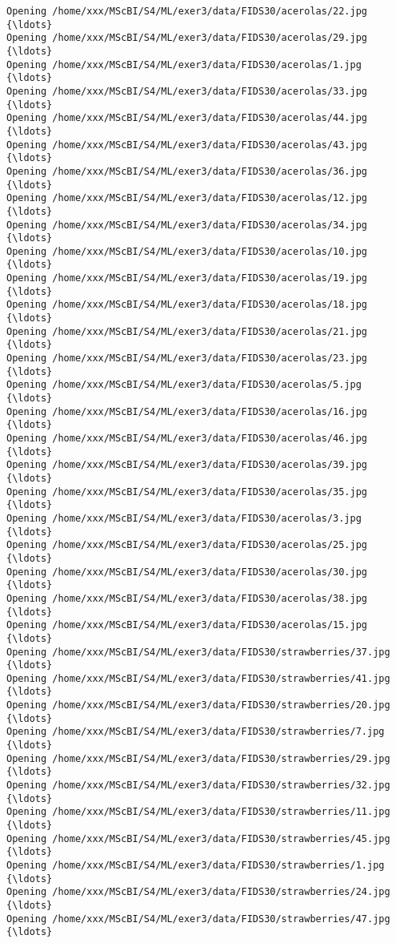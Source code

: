 \documentclass[11pt]{article}
\begin{document}
\begin{Verbatim}[commandchars=\\\{\}]
Opening /home/xxx/MScBI/S4/ML/exer3/data/FIDS30/acerolas/22.jpg  {\ldots}
Opening /home/xxx/MScBI/S4/ML/exer3/data/FIDS30/acerolas/29.jpg  {\ldots}
Opening /home/xxx/MScBI/S4/ML/exer3/data/FIDS30/acerolas/1.jpg  {\ldots}
Opening /home/xxx/MScBI/S4/ML/exer3/data/FIDS30/acerolas/33.jpg  {\ldots}
Opening /home/xxx/MScBI/S4/ML/exer3/data/FIDS30/acerolas/44.jpg  {\ldots}
Opening /home/xxx/MScBI/S4/ML/exer3/data/FIDS30/acerolas/43.jpg  {\ldots}
Opening /home/xxx/MScBI/S4/ML/exer3/data/FIDS30/acerolas/36.jpg  {\ldots}
Opening /home/xxx/MScBI/S4/ML/exer3/data/FIDS30/acerolas/12.jpg  {\ldots}
Opening /home/xxx/MScBI/S4/ML/exer3/data/FIDS30/acerolas/34.jpg  {\ldots}
Opening /home/xxx/MScBI/S4/ML/exer3/data/FIDS30/acerolas/10.jpg  {\ldots}
Opening /home/xxx/MScBI/S4/ML/exer3/data/FIDS30/acerolas/19.jpg  {\ldots}
Opening /home/xxx/MScBI/S4/ML/exer3/data/FIDS30/acerolas/18.jpg  {\ldots}
Opening /home/xxx/MScBI/S4/ML/exer3/data/FIDS30/acerolas/21.jpg  {\ldots}
Opening /home/xxx/MScBI/S4/ML/exer3/data/FIDS30/acerolas/23.jpg  {\ldots}
Opening /home/xxx/MScBI/S4/ML/exer3/data/FIDS30/acerolas/5.jpg  {\ldots}
Opening /home/xxx/MScBI/S4/ML/exer3/data/FIDS30/acerolas/16.jpg  {\ldots}
Opening /home/xxx/MScBI/S4/ML/exer3/data/FIDS30/acerolas/46.jpg  {\ldots}
Opening /home/xxx/MScBI/S4/ML/exer3/data/FIDS30/acerolas/39.jpg  {\ldots}
Opening /home/xxx/MScBI/S4/ML/exer3/data/FIDS30/acerolas/35.jpg  {\ldots}
Opening /home/xxx/MScBI/S4/ML/exer3/data/FIDS30/acerolas/3.jpg  {\ldots}
Opening /home/xxx/MScBI/S4/ML/exer3/data/FIDS30/acerolas/25.jpg  {\ldots}
Opening /home/xxx/MScBI/S4/ML/exer3/data/FIDS30/acerolas/30.jpg  {\ldots}
Opening /home/xxx/MScBI/S4/ML/exer3/data/FIDS30/acerolas/38.jpg  {\ldots}
Opening /home/xxx/MScBI/S4/ML/exer3/data/FIDS30/acerolas/15.jpg  {\ldots}
Opening /home/xxx/MScBI/S4/ML/exer3/data/FIDS30/strawberries/37.jpg  {\ldots}
Opening /home/xxx/MScBI/S4/ML/exer3/data/FIDS30/strawberries/41.jpg  {\ldots}
Opening /home/xxx/MScBI/S4/ML/exer3/data/FIDS30/strawberries/20.jpg  {\ldots}
Opening /home/xxx/MScBI/S4/ML/exer3/data/FIDS30/strawberries/7.jpg  {\ldots}
Opening /home/xxx/MScBI/S4/ML/exer3/data/FIDS30/strawberries/29.jpg  {\ldots}
Opening /home/xxx/MScBI/S4/ML/exer3/data/FIDS30/strawberries/32.jpg  {\ldots}
Opening /home/xxx/MScBI/S4/ML/exer3/data/FIDS30/strawberries/11.jpg  {\ldots}
Opening /home/xxx/MScBI/S4/ML/exer3/data/FIDS30/strawberries/45.jpg  {\ldots}
Opening /home/xxx/MScBI/S4/ML/exer3/data/FIDS30/strawberries/1.jpg  {\ldots}
Opening /home/xxx/MScBI/S4/ML/exer3/data/FIDS30/strawberries/24.jpg  {\ldots}
Opening /home/xxx/MScBI/S4/ML/exer3/data/FIDS30/strawberries/47.jpg  {\ldots}

\end{Verbatim}
\end{document}
